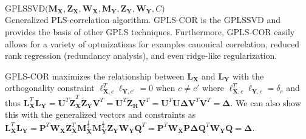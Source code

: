 \documentclass[12pt]{article}
\begin{document}
\begin{algorithm}
\DontPrintSemicolon
\SetAlgoLined
{}
\BlankLine
  $\mathrm{GPLSSVD(} {\mathbf M}_{\mathbf{X}}, {\mathbf Z}_{{\mathbf X}}, {\mathbf W}_{\mathbf{X}}, {\mathbf M}_{\mathbf{Y}}, {\mathbf Z}_{{\mathbf Y}}, {\mathbf W}_{\mathbf{Y}}, C \mathrm{)}$ \\
\caption{Generalized PLS-correlation algorithm. GPLS-COR is the GPLSSVD and provides the basis of other GPLS techniques. Furthermore, GPLS-COR easily allows for a variety of optmizations for examples canonical correlation, reduced rank regression (redundancy analysis), and even ridge-like regularization.}
\label{algo:plsc}
\end{algorithm}

GPLS-COR maximizes the relationship between \({\mathbf L}_{\mathbf X}\)
and \({\mathbf L}_{\mathbf Y}\) with the orthogonality constraint
\({\boldsymbol \ell}_{{\mathbf X},c}^{T}{\boldsymbol \ell}_{{\mathbf Y},c'} = 0\)
when \(c \neq c'\) where
\({\boldsymbol \ell}_{{\mathbf X},c}^{T}{\boldsymbol \ell}_{{\mathbf Y},c} = \delta_{c}\)
and thus
\({\mathbf L}_{\mathbf X}^{T}{\mathbf L}_{\mathbf Y} = {\mathbf U}^{T}\widetilde{\mathbf Z}_{\mathbf X}^{T}\widetilde{\mathbf Z}_{\mathbf Y}{\mathbf V}^{T} = {\mathbf U}^{T}\widetilde{\mathbf Z}_{\mathbf R}{\mathbf V}^{T} = {\mathbf U}^{T}{\mathbf U}{\boldsymbol \Delta}{\mathbf V}^{T}{\mathbf V}^{T} = {\boldsymbol \Delta}\).
We can also show this with the generalized vectors and constraints as
\({\mathbf L}_{\mathbf X}^{T}{\mathbf L}_{\mathbf Y} = {\mathbf P}^{T}{\mathbf W}_{\mathbf X}{\mathbf Z}_{\mathbf X}^{T}{\mathbf M}_{\mathbf X}^{\frac{1}{2}}{\mathbf M}_{\mathbf Y}^{\frac{1}{2}}{\mathbf Z}_{\mathbf Y}{\mathbf W}_{\mathbf Y}{\mathbf Q}^{T} = {\mathbf P}^{T}{\mathbf W}_{\mathbf X}{\mathbf P}{\boldsymbol \Delta}{\mathbf Q}^{T}{\mathbf W}_{\mathbf Y}{\mathbf Q} = {\boldsymbol \Delta}\).
\end{document}
